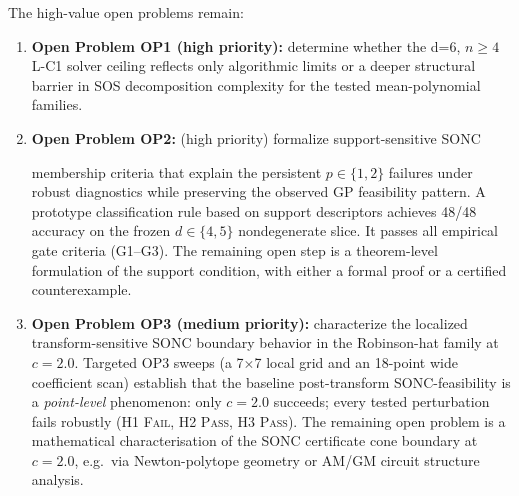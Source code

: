 \documentclass{article}
\begin{document}
The high-value open problems remain:
\begin{enumerate}
    \item \textbf{Open Problem OP1 (high priority):} determine whether the d=6, $n\geq 4$
    L-C1 solver ceiling reflects only algorithmic limits or a deeper structural barrier in
    SOS decomposition complexity for the tested mean-polynomial families.
    \item \textbf{Open Problem OP2:}
    (high priority)
    formalize support-sensitive SONC
    \begin{sloppypar}
    membership criteria that explain the persistent $p\in\{1,2\}$ failures under robust
    diagnostics while preserving the observed GP feasibility pattern.
    A prototype classification rule based on support descriptors achieves 48/48 accuracy
    on the frozen $d\in\{4,5\}$ nondegenerate slice.
    It passes all empirical gate criteria (G1--G3).
    The remaining open step is a theorem-level formulation of the support condition,
    with either a formal proof or a certified counterexample.
    \end{sloppypar}
    \item \textbf{Open Problem OP3 (medium priority):} characterize the localized
    transform-sensitive SONC boundary behavior in the Robinson-hat family at $c=2.0$.
    Targeted OP3 sweeps (a 7$\times$7 local grid and an 18-point wide coefficient scan)
    establish that the baseline post-transform SONC-feasibility is a
    \emph{point-level} phenomenon: only $c=2.0$ succeeds; every tested perturbation fails
    robustly (H1 \textsc{Fail}, H2 \textsc{Pass}, H3 \textsc{Pass}). The remaining
    open problem is a mathematical characterisation of the SONC certificate cone boundary
    at $c=2.0$, e.g.\ via Newton-polytope geometry or AM/GM circuit structure analysis.
\end{enumerate}
\end{document}
